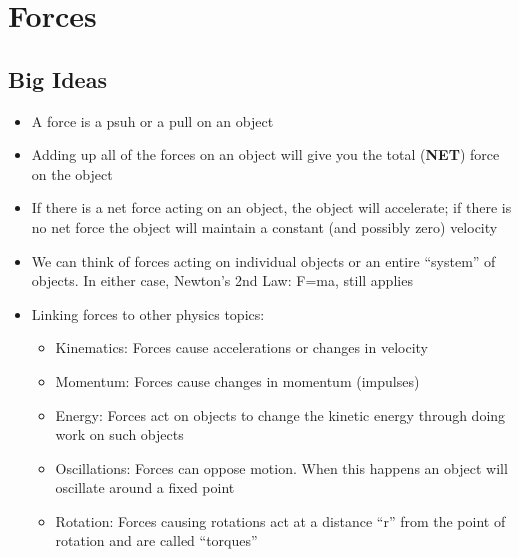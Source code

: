 \documentclass[11pt]{article}
\begin{document}
\section*{Forces}
\label{sec:orgd488dfd}
\subsection*{Big Ideas}
\label{sec:org396ff48}
\begin{itemize}
\item A force is a psuh or a pull on an object
\item Adding up all of the forces on an object will give you the total (\textbf{NET}) force on the object
\item If there is a net force acting on an object, the object will accelerate; if there is no net force the object will maintain a constant (and possibly zero) velocity
\item We can think of forces acting on individual objects or an entire ``system'' of objects. In either case, Newton's 2nd Law: F=ma, still applies
\item Linking forces to other physics topics:
\begin{itemize}
\item Kinematics: Forces cause accelerations or changes in velocity
\item Momentum: Forces cause changes in momentum (impulses)
\item Energy: Forces act on objects to change the kinetic energy through doing work on such objects
\item Oscillations: Forces can oppose motion. When this happens an object will oscillate around a fixed point
\item Rotation: Forces causing rotations act at a distance ``r'' from the point of rotation and are called ``torques''
\end{itemize}
\end{itemize}
\end{document}
